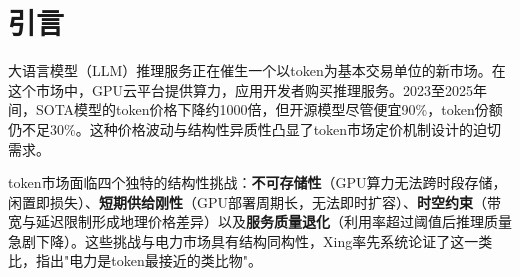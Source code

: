 \documentclass[11pt,a4paper,twocolumn]{article}
\begin{document}
\begin{abstract}
\noindent Existing token pricing research has progressed separately along spatial and temporal dimensions, but a unified model remains unexplored. Token markets face four structural challenges---non-storability, short-run supply rigidity, spatiotemporal constraints, and quality-of-service degradation---that are structurally analogous to electricity markets. We address this gap with the Spatiotemporal Token Flow Linear Program (ST-TFLP), a multi-period network-constrained optimization whose dual variables yield the spatiotemporal locational marginal service price (ST-LMSP), decomposing into five components: energy, compute scarcity, carbon cost, bandwidth congestion, and cross-period coupling---the last being our key addition, capturing GPU warm-up costs and demand time-elasticity. We further prove a structural dual-space mapping between ST-LMSP and electricity-market LMP, establishing equivalence under four specific degeneracy conditions. Revenue-neutral numerical simulations (average \$0.80/Mtok) show that omitting the temporal dimension produces a 23\% pricing bias, while dynamic pricing improves platform profit by 82.7\% and social welfare by 9.4\% over uniform pricing, restoring minimum service quality from $\phi{=}0.663$ to $\phi{=}0.988$. Cross-market comparison reveals that token dynamic pricing achieves three times the profit gain of electricity markets (83\% vs 30--60\%) with only one-third the welfare cost---reflecting token demand's inherently higher time-elasticity.

\noindent\textbf{Keywords:} token pricing; locational marginal pricing; spatiotemporal optimization; network constraints; degradation-aware; revenue neutrality

\end{abstract}

\section{引言}

大语言模型（LLM）推理服务正在催生一个以token为基本交易单位的新市场。在这个市场中，GPU云平台提供算力，应用开发者购买推理服务。2023至2025年间，SOTA模型的token价格下降约1000倍\cite{demirer2025emerging}，但开源模型尽管便宜90\%，token份额仍不足30\%\cite{demirer2025emerging}。这种价格波动与结构性异质性凸显了token市场定价机制设计的迫切需求。

token市场面临四个独特的结构性挑战：\textbf{不可存储性}（GPU算力无法跨时段存储，闲置即损失）、\textbf{短期供给刚性}（GPU部署周期长，无法即时扩容）、\textbf{时空约束}（带宽与延迟限制形成地理价格差异）以及\textbf{服务质量退化}（利用率超过阈值后推理质量急剧下降）。这些挑战与电力市场具有结构同构性\cite{xing2026tokenfutures}，Xing\cite{xing2026tokenfutures}率先系统论证了这一类比，指出"电力是token最接近的类比物"。
\end{document}

